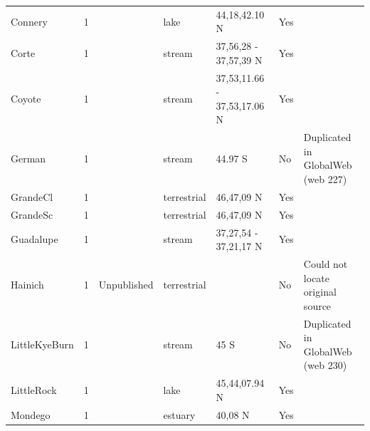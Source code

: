 \documentclass[12pt]{article}
\begin{document}
\begin{landscape}
\begin{table}[h!]
{\begin{tabular}{p{2.8cm}p{1.3cm}p{5.5cm}p{2.2cm}p{2.5cm}lp{3.5cm}}
        Connery & 1 & \citet{Havens1992}    & lake  & 44,18,42.10 N & Yes   &       \\
        Corte & 1 & \citet{Harrison1995}    & stream & 37,56,28 - 37,57,39 N & Yes   &       \\
        Coyote & 1 & \citet{Harrison1995}    & stream & 37,53,11.66 - 37,53,17.06 N & Yes   &       \\
        German & 1 & \citet{Townsend1998}  & stream & 44.97 S & No    & Duplicated in GlobalWeb (web 227) \\
        GrandeCl & 1 & \citet{CattinBlandenier2004} & terrestrial & 46,47,09 N & Yes   &       \\
        GrandeSc & 1 & \citet{CattinBlandenier2004} & terrestrial & 46,47,09 N & Yes   &       \\
        Guadalupe & 1 & \citet{Harrison1995}    & stream & 37,27,54 - 37,21,17 N & Yes   &       \\
        Hainich   & 1 & Unpublished  & terrestrial &       & No    & Could not locate original source \\
        LittleKyeBurn & 1 & \citet{Townsend1998}  & stream & 45 S  & No    & Duplicated in GlobalWeb (web 230) \\
        LittleRock & 1 & \citet{Martinez1991}    & lake  & 45,44,07.94 N & Yes   &       \\
        Mondego & 1 & \citet{Patricio2006}  & estuary & 40,08 N & Yes   &       \\
        \hline
      \end{tabular}}%
      \end{table}

        \newpage


\end{landscape}
\end{document}
